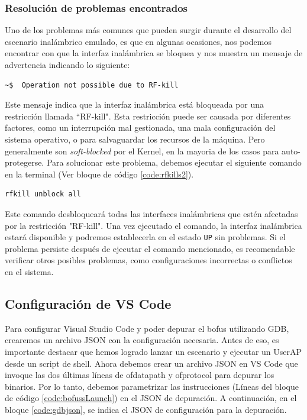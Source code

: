 \subsubsection{Resolución de problemas encontrados}
\label{subsubsec:problemasmalos}
Uno de los problemas más comunes que pueden surgir durante el desarrollo del escenario inalámbrico emulado, es que en algunas ocasiones, nos podemos encontrar con que la interfaz inalámbrica se bloquea y nos muestra un mensaje de advertencia indicando lo siguiente:\\

\begin{lstlisting}[language= bash, style=Consola, caption={Bloqueo de la interfaz por RF-Kill},label=code:rfkills1]
    ~$  Operation not possible due to RF-kill
\end{lstlisting}
\vspace{0.5cm}

Este mensaje indica que la interfaz inalámbrica está bloqueada por una restricción llamada  ``RF-kill". Esta restricción puede ser causada por diferentes factores, como un interrupción mal gestionada, una mala configuración del sistema operativo, o para salvaguardar los recursos de la máquina. Pero generalmente son \textit{soft-blocked} por el Kernel, en la mayoria de los casos para auto-protegerse. Para solucionar este problema, debemos ejecutar el siguiente comando en la terminal (Ver bloque de código \ref{code:rfkills2}).

\begin{lstlisting}[language= bash, style=Consola, caption={desbloqueo de la interfaz por RF-Kill},label=code:rfkills2]
    rfkill unblock all
\end{lstlisting}
\vspace{0.5cm}

Este comando desbloqueará todas las interfaces inalámbricas que estén afectadas por la restricción "RF-kill". Una vez ejecutado el comando, la interfaz inalámbrica estará disponible y podremos establecerla en el estado \texttt{UP} sin problemas.  Si el problema persiste después de ejecutar el comando mencionado, es recomendable verificar otros posibles problemas, como configuraciones incorrectas o conflictos en el sistema.

\subsection{Configuración de VS Code}

Para configurar Visual Studio Code  y poder depurar el \gls{bofus} utilizando GDB, crearemos un archivo JSON con la configuración necesaria. Antes de eso, es importante destacar que hemos logrado lanzar un escenario y ejecutar un UserAP desde un script de shell. Ahora debemos crear un archivo JSON en VS Code que invoque las dos últimas líneas de ofdatapath y ofprotocol para depurar los binarios. Por lo tanto, debemos parametrizar las instrucciones (Líneas del bloque de código \ref{code:bofussLaunch}) en el JSON de depuración. A continuación, en el bloque \ref{code:gdbjson}, se indica el JSON de configuración para la depuración.


